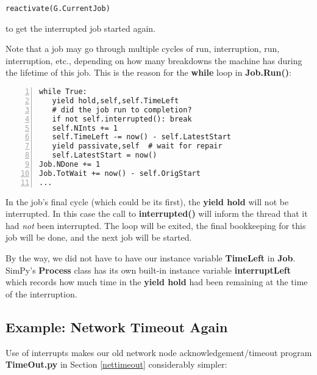 \documentclass[11pt]{article}
\begin{document}
\begin{Verbatim}[fontsize=\relsize{-2}]
reactivate(G.CurrentJob)
\end{Verbatim}

to get the interrupted job started again.

Note that a job may go through multiple cycles of run, interruption,
run, interruption, etc., depending on how many breakdowns the machine
has during the lifetime of this job.  This is the reason for the {\bf
while} loop in {\bf Job.Run()}:

\begin{Verbatim}[fontsize=\relsize{-2},numbers=left]
while True:
   yield hold,self,self.TimeLeft
   # did the job run to completion?
   if not self.interrupted(): break
   self.NInts += 1
   self.TimeLeft -= now() - self.LatestStart
   yield passivate,self  # wait for repair
   self.LatestStart = now()
Job.NDone += 1
Job.TotWait += now() - self.OrigStart
...
\end{Verbatim}

In the job's final cycle (which could be its first), the {\bf yield
hold} will not be interrupted.  In this case the call to {\bf
interrupted()} will inform the thread that it had {\it not} been
interrupted.  The loop will be exited, the final bookkeeping for this
job will be done, and the next job will be started.

By the way, we did not have to have our instance variable {\bf TimeLeft}
in {\bf Job}.  SimPy's {\bf Process} class has its own built-in instance
variable {\bf interruptLeft} which records how much time in the {\bf
yield hold} had been remaining at the time of the interruption.

\subsection{Example:  Network Timeout Again}

Use of interrupts makes our old network node acknowledgement/timeout
program {\bf TimeOut.py} in Section \ref{nettimeout} considerably
simpler:
\end{document}

